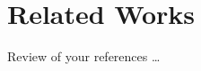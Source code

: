 \chapter{Related Works}\label{ch:review}
    Review of your references \dots \cite{Hinks2013,esa2023,nasa2023}

    \lipsum[1-3]

